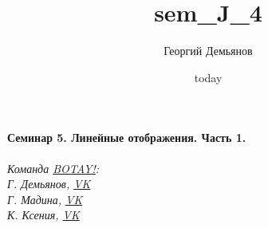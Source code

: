 \documentclass[a4paper,12pt]{article}
\title{sem_J_4}
\author{Георгий Демьянов}
\date{today}
\begin{document}
\paragraph{Семинар 5. Линейные отображения. Часть 1.}












\begin{center}
	\vfill \emph{{\small Команда \href{https://vk.com/botay_fizteh}{BOTAY!}:\\
			Г. Демьянов, \href{https://vk.com/id37346992}{VK}\\
			Г. Мадина, \href{https://vk.com/id226312463}{VK}\\
			К. Ксения, \href{https://vk.com/id143862366}{VK}\\
	}}
\end{center}
\end{document}
